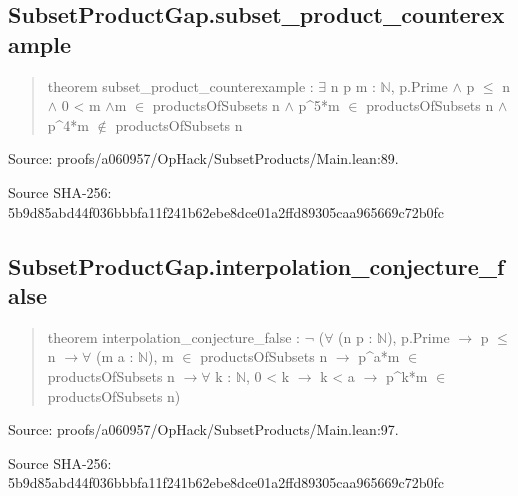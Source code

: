 \documentclass[11pt,a4paper]{article}
\begin{document}
\begin{samepage}
\subsection{SubsetProductGap.subset\_product\_counterexample}
\begin{quote}\small\ttfamily theorem subset\_product\_counterexample : \ensuremath{\exists} n p m : \ensuremath{\mathbb{N}}, p.Prime \ensuremath{\wedge} p \ensuremath{\leq} n \ensuremath{\wedge} 0 < m \ensuremath{\wedge}\newline     m \ensuremath{\in} productsOfSubsets n \ensuremath{\wedge} p\textasciicircum{}5*m \ensuremath{\in} productsOfSubsets n \ensuremath{\wedge} p\textasciicircum{}4*m \ensuremath{\notin} productsOfSubsets n\end{quote}
{\small Source: proofs/a060957/OpHack/SubsetProducts/Main.lean:89.\par}

{\small Source SHA-256: 5b9d85abd44f036bbbfa11f241b62ebe8dce01a2ffd89305caa965669c72b0fc\par}

\end{samepage}
\begin{samepage}
\subsection{SubsetProductGap.interpolation\_conjecture\_false}
\begin{quote}\small\ttfamily theorem interpolation\_conjecture\_false : \ensuremath{\neg} (\ensuremath{\forall} (n p : \ensuremath{\mathbb{N}}), p.Prime \ensuremath{\to} p \ensuremath{\leq} n \ensuremath{\to}\newline     \ensuremath{\forall} (m a : \ensuremath{\mathbb{N}}), m \ensuremath{\in} productsOfSubsets n \ensuremath{\to} p\textasciicircum{}a*m \ensuremath{\in} productsOfSubsets n \ensuremath{\to}\newline     \ensuremath{\forall} k : \ensuremath{\mathbb{N}}, 0 < k \ensuremath{\to} k < a \ensuremath{\to} p\textasciicircum{}k*m \ensuremath{\in} productsOfSubsets n)\end{quote}
{\small Source: proofs/a060957/OpHack/SubsetProducts/Main.lean:97.\par}

{\small Source SHA-256: 5b9d85abd44f036bbbfa11f241b62ebe8dce01a2ffd89305caa965669c72b0fc\par}

\end{samepage}
\end{document}
